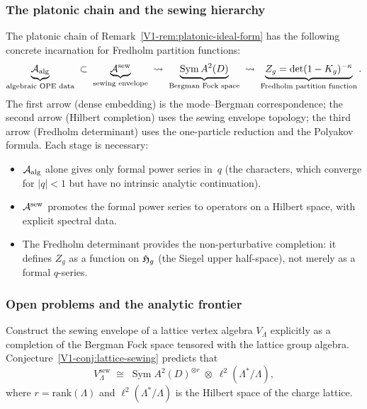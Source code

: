 \subsubsection{The platonic chain and the sewing hierarchy}

\begin{remark}%
%
The platonic chain of Remark~\ref{V1-rem:platonic-ideal-form}
has the following concrete incarnation for Fredholm partition
functions:
\[
\underbrace{\mathcal{A}_{\mathrm{alg}}}_{\text{algebraic OPE data}}
\;\subset\;
\underbrace{\mathcal{A}^{\mathrm{sew}}}_{\text{sewing envelope}}
\;\rightsquigarrow\;
\underbrace{\operatorname{Sym} A^2(D)}_{\text{Bergman Fock space}}
\;\rightsquigarrow\;
\underbrace{Z_g = \det(1 - K_g)^{-\kappa}}_{\text{Fredholm
partition function}}.
\]
The first arrow (dense embedding) is the mode--Bergman
correspondence; the second arrow (Hilbert completion) uses
the sewing envelope topology; the third arrow (Fredholm
determinant) uses the one-particle reduction and the
Polyakov formula.
Each stage is necessary:
\begin{itemize}
\item $\mathcal{A}_{\mathrm{alg}}$ alone gives only formal power series in~$q$
 (the characters, which converge for $|q| < 1$ but have no
 intrinsic analytic continuation).
\item $\mathcal{A}^{\mathrm{sew}}$ promotes the formal power series to operators
 on a Hilbert space, with explicit spectral data.
\item The Fredholm determinant provides the non-perturbative
 completion: it defines $Z_g$ as a function on $\mathfrak{H}_g$
 (the Siegel upper half-space), not merely as a formal
 $q$-series.
\end{itemize}
\end{remark}

\subsubsection{Open problems and the analytic frontier}

\begin{openproblem}%
%
Construct the sewing envelope of a lattice vertex algebra
$V_\Lambda$ explicitly as a completion of the Bergman Fock
space tensored with the lattice group algebra.
Conjecture~\textup{\ref{V1-conj:lattice-sewing}} predicts that
\begin{equation}%
V_\Lambda^{\mathrm{sew}}
\;\cong\;
\operatorname{Sym} A^2(D)^{\otimes r}
\;\otimes\;
\ell^2(\Lambda^*/\Lambda),
\end{equation}
where $r = \mathrm{rank}(\Lambda)$ and
$\ell^2(\Lambda^*/\Lambda)$ is the Hilbert space of the
charge lattice.
\end{openproblem}

